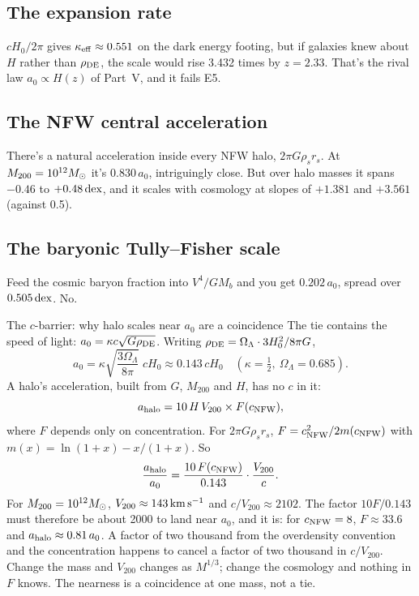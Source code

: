 

\subsection{The expansion rate}

$cH_0/2\pi$ gives $\kappa_{\rm eff}\approx0.551$ on the dark energy footing, but if galaxies knew about $H$ rather than $\rho_{\rm DE}$, the scale would rise 3.432 times by $z=2.33$. That's the rival law $a_0\propto H(z)$ of Part~V, and it fails E5.

\subsection{The NFW central acceleration}

There's a natural acceleration inside every NFW halo, $2\pi G\rho_sr_s$. At $M_{200}=10^{12}M_\odot$ it's $0.830\,a_0$, intriguingly close. But over halo masses it spans $-0.46$ to $+0.48\,\mathrm{dex}$, and it scales with cosmology at slopes of $+1.381$ and $+3.561$ (against 0.5).

\subsection{The baryonic Tully--Fisher scale}

Feed the cosmic baryon fraction into $V^4/GM_b$ and you get $0.202\,a_0$, spread over $0.505\,\mathrm{dex}$. No.

\begin{mathbox}{The $c$-barrier: why halo scales near $a_0$ are a coincidence}
The tie contains the speed of light: $a_0=\kappa c\sqrt{G\rho_{\rm DE}}$. Writing $\rho_{\rm DE}=\Omega_\Lambda\cdot3H_0^2/8\pi G$,
\[
a_0=\kappa\sqrt{\frac{3\Omega_\Lambda}{8\pi}}\;cH_0\approx0.143\,cH_0\quad(\kappa=\tfrac12,\ \Omega_\Lambda=0.685).
\]
A halo's acceleration, built from $G$, $M_{200}$ and $H$, has no $c$ in it:
\[
a_{\rm halo}=10\,H\,V_{200}\times F(c_{\rm NFW}),
\]
where $F$ depends only on concentration. For $2\pi G\rho_sr_s$, $F=c_{\rm NFW}^2/2m(c_{\rm NFW})$ with $m(x)=\ln(1+x)-x/(1+x)$. So
\[
\frac{a_{\rm halo}}{a_0}=\frac{10\,F(c_{\rm NFW})}{0.143}\cdot\frac{V_{200}}{c}.
\]
For $M_{200}=10^{12}M_\odot$, $V_{200}\approx143\,\mathrm{km\,s^{-1}}$ and $c/V_{200}\approx2102$. The factor $10F/0.143$ must therefore be about 2000 to land near $a_0$, and it is: for $c_{\rm NFW}=8$, $F\approx33.6$ and $a_{\rm halo}\approx0.81\,a_0$. A factor of two thousand from the overdensity convention and the concentration happens to cancel a factor of two thousand in $c/V_{200}$. Change the mass and $V_{200}$ changes as $M^{1/3}$; change the cosmology and nothing in $F$ knows. The nearness is a coincidence at one mass, not a tie.
\end{mathbox}

